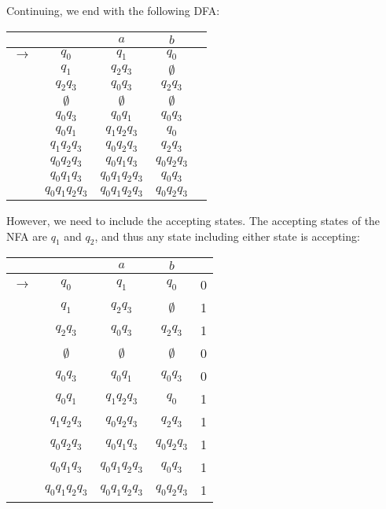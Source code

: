 Continuing, we end with the following DFA:

\begin{center}\begin{tabular}{c c|c c r}
         & & $a$ & $b$ & \\\hline
    $\to$ & $q_0$ & $q_1$ & $q_0$ &  \\
          & $q_1$ & $q_2q_3$ & $\emptyset$ & \\
          & $q_2q_3$ & $q_0q_3$ & $q_2q_3$ & \\
          & $\emptyset$ & $\emptyset$ & $\emptyset$ &\\
          & $q_0q_3$ & $q_0q_1$ & $q_0q_3$ & \\
          & $q_0q_1$ & $q_1q_2q_3$ & $q_0$ & \\
          & $q_1q_2q_3$ & $q_0q_2q_3$ & $q_2q_3$ & \\
          & $q_0q_2q_3$ & $q_0q_1q_3$ & $q_0q_2q_3$ & \\
          & $q_0q_1q_3$ & $q_0q_1q_2q_3$ & $q_0q_3$ & \\
          & $q_0q_1q_2q_3$ & $q_0q_1q_2q_3$ & $q_0q_2q_3$ & \\
\end{tabular}\end{center}

However, we need to include the accepting states. The accepting states of the NFA are $q_1$ and $q_2$, and thus any state including either state is accepting:

\begin{center}\begin{tabular}{c c|c c r}
         & & $a$ & $b$ & \\\hline
    $\to$ & $q_0$ & $q_1$ & $q_0$ & 0 \\
          & $q_1$ & $q_2q_3$ & $\emptyset$ & 1 \\
          & $q_2q_3$ & $q_0q_3$ & $q_2q_3$ & 1 \\
          & $\emptyset$ & $\emptyset$ & $\emptyset$ & 0\\
          & $q_0q_3$ & $q_0q_1$ & $q_0q_3$ & 0 \\
          & $q_0q_1$ & $q_1q_2q_3$ & $q_0$ & 1 \\
          & $q_1q_2q_3$ & $q_0q_2q_3$ & $q_2q_3$ & 1 \\
          & $q_0q_2q_3$ & $q_0q_1q_3$ & $q_0q_2q_3$ & 1 \\
          & $q_0q_1q_3$ & $q_0q_1q_2q_3$ & $q_0q_3$ & 1 \\
          & $q_0q_1q_2q_3$ & $q_0q_1q_2q_3$ & $q_0q_2q_3$ & 1\\
\end{tabular}\end{center}

